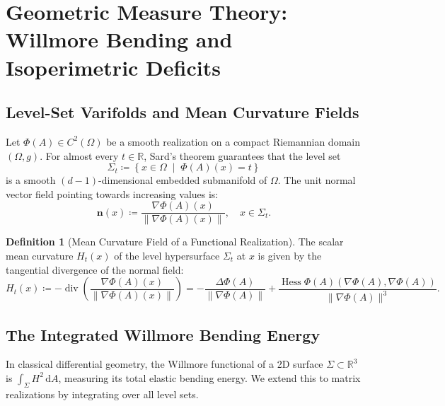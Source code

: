 \documentclass[11pt,a4paper,reqno]{amsart}
\theoremstyle{definition}
\newtheorem{definition}[theorem]{Definition}
\numberwithin{equation}{section}
\newcommand{\R}{\mathbb{R}}
\newcommand{\dif}{\,\mathrm{d}}
\newcommand{\Hess}{\operatorname{Hess}}
\begin{document}
\section{Geometric Measure Theory: Willmore Bending and Isoperimetric Deficits}
\label{sec:willmore_gmt}

\subsection{Level-Set Varifolds and Mean Curvature Fields}
Let $\Phi(A) \in C^2(\Omega)$ be a smooth realization on a compact Riemannian domain $(\Omega, g)$. For almost every $t \in \R$, Sard's theorem guarantees that the level set
\begin{equation}
    \Sigma_t \coloneqq \left\{ x \in \Omega \;\middle|\; \Phi(A)(x) = t \right\}
\end{equation}
is a smooth $(d-1)$-dimensional embedded submanifold of $\Omega$. The unit normal vector field pointing towards increasing values is:
\begin{equation}
    \mathbf{n}(x) \coloneqq \frac{\nabla \Phi(A)(x)}{\|\nabla \Phi(A)(x)\|}, \quad x \in \Sigma_t.
\end{equation}

\begin{definition}[Mean Curvature Field of a Functional Realization]
The scalar mean curvature $H_t(x)$ of the level hypersurface $\Sigma_t$ at $x$ is given by the tangential divergence of the normal field:
\begin{equation}
    H_t(x) \coloneqq -\operatorname{div}\left( \frac{\nabla \Phi(A)(x)}{\|\nabla \Phi(A)(x)\|} \right) = -\frac{\Delta \Phi(A)}{\|\nabla \Phi(A)\|} + \frac{\Hess \Phi(A)(\nabla \Phi(A), \nabla \Phi(A))}{\|\nabla \Phi(A)\|^3}.
\end{equation}
\end{definition}

\subsection{The Integrated Willmore Bending Energy}
In classical differential geometry, the Willmore functional of a 2D surface $\Sigma \subset \R^3$ is $\int_\Sigma H^2 \dif A$, measuring its total elastic bending energy. We extend this to matrix realizations by integrating over all level sets.
\end{document}
